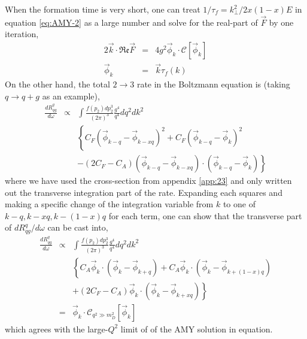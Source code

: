\documentclass[aps, prc, reprint, amsmath, groupedaddress, nofootinbib]{revtex4-1}
\begin{document}
When the formation time is very short, one can treat $1/\tau_f = k_\perp^2/2x(1-x)E$ in equation \ref{eq:AMY-2} as a large number and solve for the real-part of $\vec{F}$ by one iteration,
\begin{eqnarray}
2\vec{k}\cdot\mathfrak{Re} \vec{F} &=& 4 g^2 \vec{\phi}_k\cdot \mathcal{C}[\vec{\phi}_k] \\
\vec{\phi}_k &=& \vec{k}\tau_f(k)
\end{eqnarray}
On the other hand, the total $2\rightarrow 3$ rate in the Boltzmann equation is (taking $q\rightarrow q+g$ as an example),
\begin{eqnarray}
\frac{dR^{q}_{qg}}{d\omega} &\propto&  \int  \frac{f(p_2)dp_2^3}{(2\pi)^3}  \frac{g^4}{q^4} dq^2 d k^2\\\nonumber
&& \left\{
C_F\left( \vec{\phi}_{k-q}-\vec{\phi}_{k-xq} \right)^2
+ C_F\left( \vec{\phi}_{k-q}-\vec{\phi}_{k} \right)^2\right.\\\nonumber
&&\left.
- (2C_F-C_A)\left( \vec{\phi}_{k-q}-\vec{\phi}_{k-xq} \right)\cdot \left( \vec{\phi}_{k-q}-\vec{\phi}_{k} \right)
\right\}
\end{eqnarray}
where we have used the cross-section from appendix \ref{app:23} and only written out the transverse integration part of the rate.
Expanding each squares and making a specific change of the integration variable from $k$ to one of $k-q, k-xq, k-(1-x)q$ for each term, one can show that the transverse part of $dR^{q}_{qg}/d\omega$ can be cast into,
\begin{eqnarray}
\frac{dR^{q}_{qg}}{d\omega} &\propto& \int  \frac{f(p_2)dp_2^3}{(2\pi)^3} \frac{g^4}{q^4} d q^2 dk^2\\\nonumber
&& \left\{
C_A\vec{\phi}_{k}\cdot \left( \vec{\phi}_{k}-\vec{\phi}_{k+q} \right)
+C_A\vec{\phi}_{k} \cdot \left( \vec{\phi}_k - \vec{\phi}_{k+(1-x)q}\right) \right.\\\nonumber
&&\left.+(2C_F-C_A)\vec{\phi}_{k} \cdot \left(\vec{\phi}_k-\vec{\phi}_{k+xq} \right)
\right\} \\
&=&  \vec{\phi}_k \cdot \mathcal{C}_{q^2\gg m_D^2}[\vec{\phi}_k]
\end{eqnarray}
which agrees with the large-$Q^2$ limit of of the AMY solution in equation. 
\end{document}
